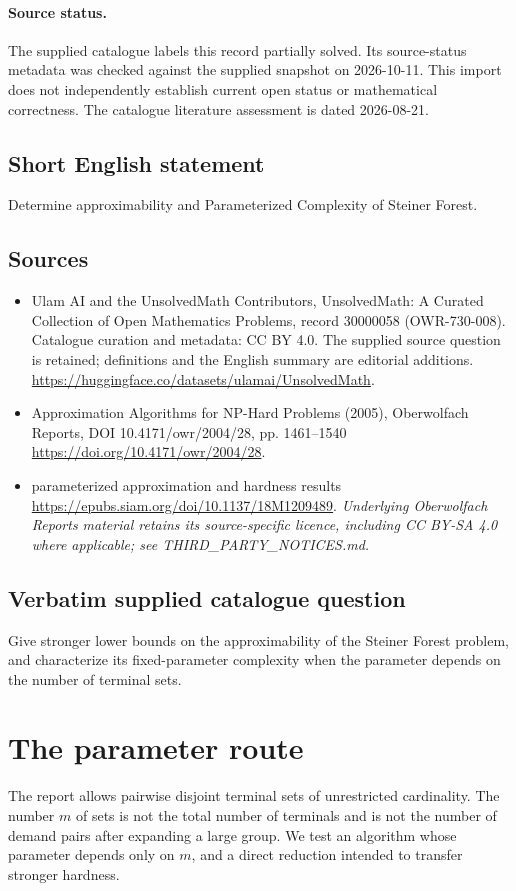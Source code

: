 \documentclass[11pt]{article}
\begin{document}
\paragraph{Source status.}
The supplied catalogue labels this record partially solved. Its source-status metadata was checked against the supplied snapshot on 2026-10-11. This import does not independently establish current open status or mathematical correctness. The catalogue literature assessment is dated 2026-08-21.
\subsection{Short English statement}
Determine approximability and Parameterized Complexity of Steiner Forest.
\subsection{Sources}
\begin{itemize}
\item[S1] Ulam AI and the UnsolvedMath Contributors, UnsolvedMath: A Curated Collection of Open Mathematics Problems, record 30000058 (OWR-730-008). Catalogue curation and metadata: CC BY 4.0. The supplied source question is retained; definitions and the English summary are editorial additions.
\url{https://huggingface.co/datasets/ulamai/UnsolvedMath}.
\item[S2] Approximation Algorithms for NP-Hard Problems (2005), Oberwolfach Reports, DOI 10.4171/owr/2004/28, pp. 1461--1540
\url{https://doi.org/10.4171/owr/2004/28}.
\item[S3] parameterized approximation and hardness results
\url{https://epubs.siam.org/doi/10.1137/18M1209489}.
\textit{Underlying Oberwolfach Reports material retains its source-specific licence, including CC BY-SA 4.0 where applicable; see THIRD\_PARTY\_NOTICES.md.}
\end{itemize}
\subsection{Verbatim supplied catalogue question}
Give stronger lower bounds on the approximability of the Steiner Forest problem, and characterize its fixed-parameter complexity when the parameter depends on the number of terminal sets.

\section{The parameter route}
The report allows pairwise disjoint terminal sets of unrestricted
cardinality. The number $m$ of sets is not the total number of
terminals and is not the number of demand pairs after expanding a
large group. We test an algorithm whose parameter depends only on
$m$, and a direct reduction intended to transfer stronger hardness.
\end{document}
